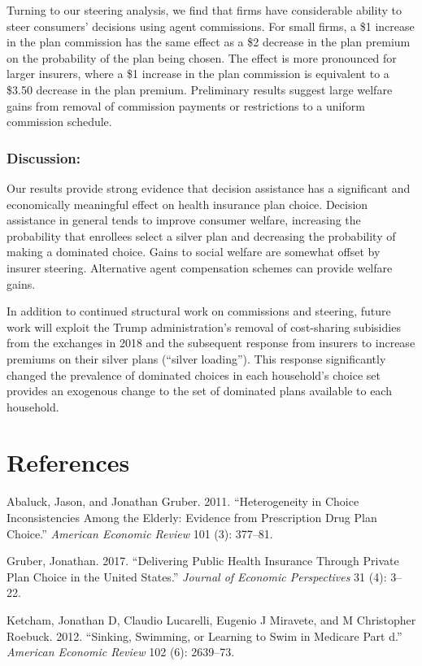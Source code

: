 \documentclass[
  11pt,
]{article}
\newlength{\cslhangindent}
\newenvironment{cslreferences}%
  {\setlength{\parindent}{0pt}%
  \everypar{\setlength{\hangindent}{\cslhangindent}}\ignorespaces}%
  {\par}
\begin{document}
Turning to our steering analysis, we find that firms have considerable ability to steer consumers' decisions using agent commissions. For small firms, a \$1 increase in the plan commission has the same effect as a \$2 decrease in the plan premium on the probability of the plan being chosen. The effect is more pronounced for larger insurers, where a \$1 increase in the plan commission is equivalent to a \$3.50 decrease in the plan premium. Preliminary results suggest large welfare gains from removal of commission payments or restrictions to a uniform commission schedule.

\hypertarget{discussion}{%
\subsubsection{Discussion:}\label{discussion}}

Our results provide strong evidence that decision assistance has a significant and economically meaningful effect on health insurance plan choice. Decision assistance in general tends to improve consumer welfare, increasing the probability that enrollees select a silver plan and decreasing the probability of making a dominated choice. Gains to social welfare are somewhat offset by insurer steering. Alternative agent compensation schemes can provide welfare gains.

In addition to continued structural work on commissions and steering, future work will exploit the Trump administration's removal of cost-sharing subisidies from the exchanges in 2018 and the subsequent response from insurers to increase premiums on their silver plans (``silver loading''). This response significantly changed the prevalence of dominated choices in each household's choice set provides an exogenous change to the set of dominated plans available to each household.

\hypertarget{references}{%
\section*{References}\label{references}}

\hypertarget{refs}{}
\begin{cslreferences}
\leavevmode\hypertarget{ref-abaluck2011}{}%
Abaluck, Jason, and Jonathan Gruber. 2011. ``Heterogeneity in Choice Inconsistencies Among the Elderly: Evidence from Prescription Drug Plan Choice.'' \emph{American Economic Review} 101 (3): 377--81.

\leavevmode\hypertarget{ref-gruber2017}{}%
Gruber, Jonathan. 2017. ``Delivering Public Health Insurance Through Private Plan Choice in the United States.'' \emph{Journal of Economic Perspectives} 31 (4): 3--22.

\leavevmode\hypertarget{ref-ketcham2012}{}%
Ketcham, Jonathan D, Claudio Lucarelli, Eugenio J Miravete, and M Christopher Roebuck. 2012. ``Sinking, Swimming, or Learning to Swim in Medicare Part d.'' \emph{American Economic Review} 102 (6): 2639--73.
\end{cslreferences}
\end{document}
